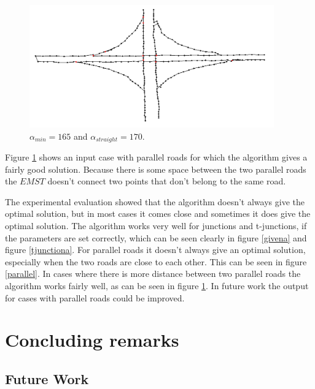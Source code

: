 \documentclass[11pt]{article}
\begin{document}
\begin{figure}[h]
  \centering
  \graphicspath{ {images/}}
  \includegraphics[width=\linewidth, height=150pt]{knooppunt167_170}
  \caption{$\alpha_{min}=165$ and $\alpha_{straight}=170$.}
  \label{knooppunt}
\end{figure}

Figure \ref{knooppunt} shows an input case with parallel roads for which the algorithm gives a fairly good solution. Because there is some space between the two parallel roads the $EMST$ doesn't connect two points that don't belong to the same road.

The experimental evaluation showed that the algorithm doesn't always give the optimal solution, but in most cases it comes close and sometimes it does give the optimal solution. The algorithm works very well for junctions and t-junctions, if the parameters are set correctly, which can be seen clearly in figure \ref{givena} and figure \ref{tjunctiona}. For parallel roads it doesn't always give an optimal solution, especially when the two roads are close to each other. This can be seen in figure \ref{parallel}. In cases where there is more distance between two parallel roads the algorithm works fairly well, as can be seen in figure \ref{knooppunt}. In future work the output for cases with parallel roads could be improved.


\section{Concluding remarks}



\subsection{Future Work}

\end{document}
